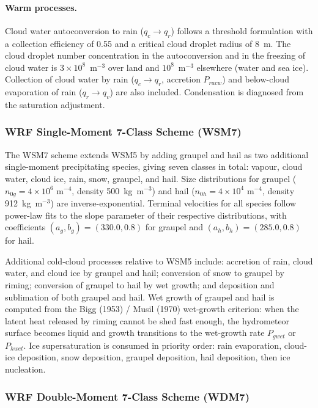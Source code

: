 {\paragraph{Warm processes.}
Cloud water autoconversion to rain ($q_c \to q_r$) follows a threshold
formulation with a collection efficiency of 0.55 and a critical cloud droplet
radius of $8$~\textmu m.  The cloud droplet number concentration in the
autoconversion and in the freezing of cloud water is
$3\times10^{8}$~m$^{-3}$ over land and $10^{8}$~m$^{-3}$ elsewhere (water and
sea ice).  Collection of cloud water by rain ($q_c \to q_r$,
accretion $P_{racw}$) and below-cloud evaporation of rain ($q_r \to q_v$) are
also included.  Condensation is diagnosed from the saturation adjustment.

\subsubsection{WRF Single-Moment 7-Class Scheme (WSM7)}
\label{sec:wsm7}

The WSM7 scheme \citep{HongLim_06} extends WSM5 by adding graupel and hail as
two additional single-moment precipitating species, giving seven classes in
total: vapour, cloud water, cloud ice, rain, snow, graupel, and hail.  Size
distributions for graupel ($n_{0g} = 4\times10^6$ m$^{-4}$, density
500~kg~m$^{-3}$) and hail ($n_{0h} = 4\times10^4$ m$^{-4}$, density
912~kg~m$^{-3}$) are inverse-exponential.  Terminal velocities for all species
follow power-law fits to the slope parameter of their respective distributions,
with coefficients $(a_g, b_g) = (330.0, 0.8)$ for graupel and
$(a_h, b_h) = (285.0, 0.8)$ for hail.

Additional cold-cloud processes relative to WSM5 include: accretion of rain,
cloud water, and cloud ice by graupel and hail; conversion of snow to graupel
by riming; conversion of graupel to hail by wet growth; and deposition and
sublimation of both graupel and hail.  Wet growth of graupel and hail is
computed from the Bigg (1953) / Musil (1970) wet-growth criterion: when the
latent heat released by riming cannot be shed fast enough, the hydrometeor
surface becomes liquid and growth transitions to the wet-growth rate
$P_{gwet}$ or $P_{hwet}$.  Ice supersaturation is consumed in priority order:
rain evaporation, cloud-ice deposition, snow deposition, graupel deposition,
hail deposition, then ice nucleation.

\subsubsection{WRF Double-Moment 7-Class Scheme (WDM7)}
\label{sec:wdm7}

}
